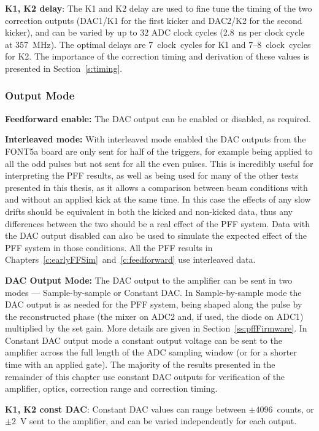 \textbf{K1, K2 delay}: The K1 and K2 delay are used to fine tune the timing of the two correction outputs (DAC1/K1 for the first kicker and DAC2/K2 for the second kicker), and can be varied by up to 32 ADC clock cycles (2.8~ns per clock cycle at 357~MHz). The optimal delays are 7~clock~cycles for K1 and 7--8~clock~cycles for K2. The importance of the correction timing and derivation of these values is presented in Section~\ref{s:timing}.

\subsubsection{Output Mode}

\textbf{Feedforward enable:} The DAC output can be enabled or disabled, as required.

\textbf{Interleaved mode:} With interleaved mode enabled the DAC outputs from the FONT5a board are only sent for half of the triggers, for example being applied to all the odd pulses but not sent for all the even pulses. This is incredibly useful for interpreting the PFF results, as well as being used for many of the other tests presented in this thesis, as it allows a comparison between beam conditions with and without an applied kick at the same time. In this case the effects of any slow drifts should be equivalent in both the kicked and non-kicked data, thus any differences between the two should be a real effect of the PFF system. Data with the DAC output disabled can also be used to simulate the expected effect of the PFF system in those conditions. All the PFF results in Chapters~\ref{c:earlyFFSim}~and~\ref{c:feedforward} use interleaved data.

\textbf{DAC Output Mode:} The DAC output to the amplifier can be sent in two modes --- Sample-by-sample or Constant DAC. In Sample-by-sample mode the DAC output is as needed for the PFF system, being shaped along the pulse by the reconstructed phase (the mixer on ADC2 and, if used, the diode on ADC1) multiplied by the set gain. More details are given in Section~\ref{ss:pffFirmware}. In Constant DAC output mode a constant output voltage can be sent to the amplifier across the full length of the ADC sampling window (or for a shorter time with an applied gate). The majority of the results presented in the remainder of this chapter use constant DAC outputs for verification of the amplifier, optics, correction range and correction timing.

\textbf{K1, K2 const DAC}: Constant DAC values can range between \(\pm4096\)~counts, or \(\pm2\)~V sent to the amplifier, and can be varied independently for each output.

